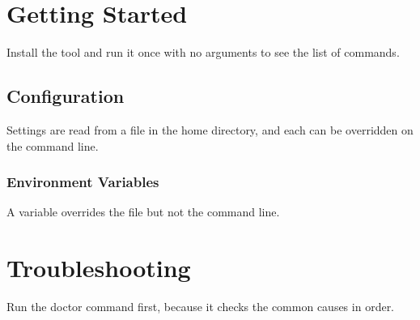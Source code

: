 \documentclass{article}
\begin{document}
\section*{Getting Started}

Install the tool and run it once with no arguments to see the list of commands.

\subsection*{Configuration}

Settings are read from a file in the home directory, and each can be overridden on
the command line.

\subsubsection*{Environment Variables}

A variable overrides the file but not the command line.

\section*{Troubleshooting}

Run the doctor command first, because it checks the common causes in order.
\end{document}
